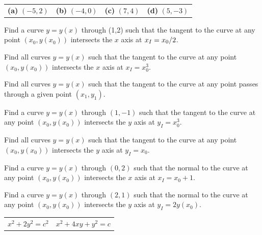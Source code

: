 \begin{exerciselist}
  \begin{tabular}[t]{@{}p{78pt}@{}p{78pt}p{78pt}p{78pt}}
    {\bf (a)}\; $(-5,2)$ & {\bf (b)}\; $(-4,0)$ & {\bf (c)}\; $(7,4)$ & {\bf (d)}\; $(5,-3)$
  \end{tabular}

  \item\label{exer:4.5.18} Find a curve $y=y(x)$ through (1,2) such that the tangent to the curve at
        any point $(x_{0},y(x_{0}))$ intersects the $x$ axis at $\displaystyle{x_{I}=x_{0}/2}$.

  \item\label{exer:4.5.19} Find all curves $y=y(x)$ such that the tangent to the curve at any point
        $(x_{0},y(x_{0}))$ intersects the $x$ axis at $x_{I}=x^{3}_{0}$.

  \item\label{exer:4.5.20} Find all curves $y=y(x)$ such that the tangent to the curve at any point
        passes through a given point $(x_{1},y_{1})$.

  \item\label{exer:4.5.21} Find a curve $y=y(x)$ through $(1,-1)$ such that the tangent to the curve
        at any point $(x_{0},y(x_{0}))$ intersects the $y$ axis at $y_{I}=x^{3}_{0}$.

  \item\label{exer:4.5.22} Find all curves $y=y(x)$ such that the tangent to the curve at any point
        $(x_{0},y(x_{0}))$ intersects the $y$ axis at $y_{I}=x_{0}$.

  \item\label{exer:4.5.23} Find a curve $y=y(x)$ through $(0,2)$ such that the normal to the curve
        at any point $(x_{0},y(x_{0}))$ intersects the $x$ axis at $x_{I}=x_{0}+1$.

  \item\label{exer:4.5.24} Find a curve $y=y(x)$ through $(2,1)$ such that the normal to the curve
        at any point $(x_{0},y(x_{0}))$ intersects the $y$ axis at $y_{I}=2y(x_{0})$.


  \begin{tabular}[t]{@{}p{168pt}@{}p{168pt}}
    \item\label{exer:4.5.25} $x^{2}+2y^{2}=c^{2}$ & \vspace*{10pt}
    \item\label{exer:4.5.26} $x^{2}+4xy+y^{2}=c$
  \end{tabular}


\end{exerciselist}
